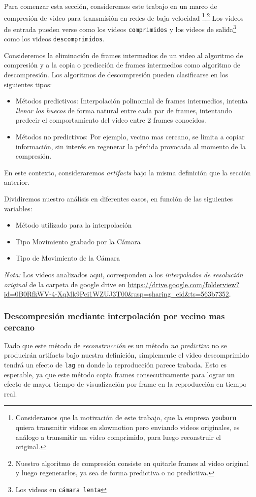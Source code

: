 Para comenzar esta sección, consideremos este trabajo en un marco de compresión de video para transmisión en redes de baja velocidad \footnote{Consideramos que la motivación de este trabajo, que la empresa \texttt{youborn} quiera transmitir videos en slowmotion pero enviando videos originales, es análogo a transmitir un video comprimido, para luego reconstruir el original.}.\footnote{Nuestro algoritmo de compresión consiste en quitarle frames al video original y luego regenerarlos, ya sea de forma predictiva o no predictiva.} Los videos de entrada pueden verse como los videos \texttt{comprimidos} y los videos de salida\footnote{Los videos en \texttt{cámara lenta}} como los videos \texttt{descomprimidos}.

Consideremos la eliminación de frames intermedios de un video al algoritmo de compresión y a la copia o predicción de frames intermedios como algoritmo de descompresión. Los algoritmos de descompresión pueden clasificarse en los siguientes tipos:
\begin{itemize}
	\item Métodos predictivos: Interpolación polinomial de frames intermedios, intenta \emph{llenar los huecos} de forma natural entre cada par de frames, intentando predecir el comportamiento del video entre 2 frames conocidos.
	\item Métodos no predictivos: Por ejemplo, vecino mas cercano, se limita a copiar información, sin interés en regenerar la pérdida provocada al momento de la compresión.
\end{itemize}

En este contexto, consideraremos \emph{artifacts} bajo la misma definición que la sección anterior.

Dividiremos nuestro análisis en diferentes casos, en función de las siguientes variables:
\begin{itemize}
	\item Método utilizado para la interpolación
	\item Tipo Movimiento grabado por la Cámara
	\item Tipo de Movimiento de la Cámara
\end{itemize}

\emph{Nota:} Los videos analizados aqui, corresponden a los \emph{interpolados de resolución original} de la carpeta de google drive en \url{https://drive.google.com/folderview?id=0B0RfkWV-4-XqMk9Pei1WZUJ3T00&usp=sharing_eid&ts=563b7352}.

\subsubsection{\bf{Descompresión mediante interpolación por vecino mas cercano}}
Dado que este método de \emph{reconstrucción} es un método \emph{no predictivo} no se producirán artifacts bajo nuestra definición, simplemente el video descomprimido tendrá un efecto de \texttt{lag} en donde la reproducción parece trabada. Esto es esperable, ya que este método copia frames consecutivamente para lograr un efecto de mayor tiempo de visualización por frame en la reproducción en tiempo real. 

